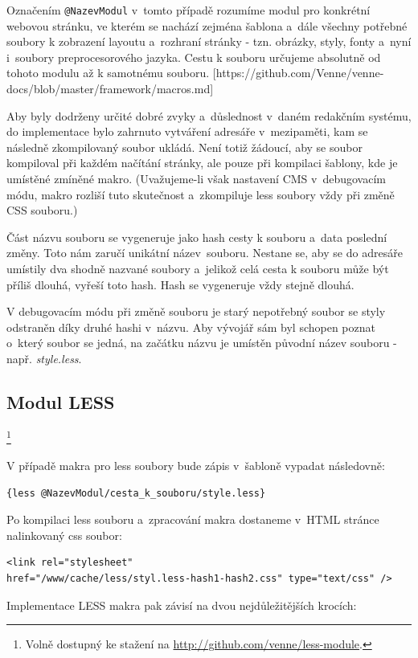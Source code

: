 \documentclass[thesis=B,czech]{FITthesis}[2012/06/26]
\begin{document}
Označením \verb#@NazevModul# v~tomto případě rozumíme modul pro konkrétní webovou stránku, ve kterém se nachází zejména  šablona a~dále všechny potřebné soubory k zobrazení layoutu a~rozhraní stránky - tzn. obrázky, styly, fonty a~nyní i~soubory preprocesorového jazyka. Cestu k souboru určujeme absolutně od tohoto modulu až k samotnému souboru. [https://github.com/Venne/venne-docs/blob/master/framework/macros.md]

Aby byly dodrženy určité dobré zvyky a~důslednost v~daném redakčním systému, do implementace bylo zahrnuto vytváření adresáře v~mezipaměti, kam se následně zkompilovaný soubor ukládá. Není totiž žádoucí, aby se soubor kompiloval při každém načítání stránky, ale pouze při kompilaci šablony, kde je umístěné zmíněné makro. (Uvažujeme-li však nastavení \gls{CMS} v~debugovacím módu, makro rozliší tuto skutečnost a~zkompiluje less soubory vždy při změně \gls{CSS} souboru.)  

Část názvu souboru se vygeneruje jako hash cesty k souboru a~data poslední změny. Toto nám zaručí unikátní název~souboru. Nestane se, aby se do adresáře umístily dva shodně nazvané soubory a~jelikož celá cesta k souboru může být příliš dlouhá, vyřeší toto hash. Hash se vygeneruje vždy stejně dlouhá.

V debugovacím módu při změně souboru je starý nepotřebný soubor se styly odstraněn díky druhé hashi v~názvu. Aby vývojář sám byl schopen poznat o~který soubor se jedná, na začátku názvu je umístěn původní název souboru - např. \textit{style.less}.



\subsection{Modul LESS}\footnote{Volně dostupný ke stažení na \url{http://github.com/venne/less-module}.}

V případě makra pro less soubory bude zápis v~šabloně vypadat následovně:
\scriptsize
\begin{verbatim}
{less @NazevModul/cesta_k_souboru/style.less}
\end{verbatim}
\normalsize
Po kompilaci less souboru a~zpracování makra dostaneme v~\gls{HTML} stránce nalinkovaný css soubor:
\scriptsize
\begin{verbatim}
<link rel="stylesheet"
href="/www/cache/less/styl.less-hash1-hash2.css" type="text/css" />
\end{verbatim}
\normalsize
Implementace LESS makra pak závisí na dvou nejdůležitějších krocích:
\end{document}
